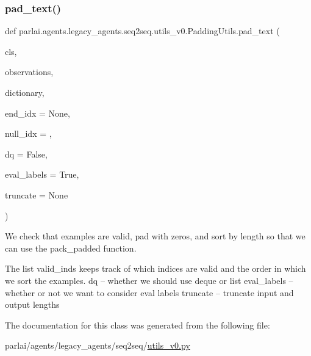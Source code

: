 \subsubsection{\texorpdfstring{pad\+\_\+text()}{pad\_text()}}
{\footnotesize\ttfamily def parlai.\+agents.\+legacy\+\_\+agents.\+seq2seq.\+utils\+\_\+v0.\+Padding\+Utils.\+pad\+\_\+text (\begin{DoxyParamCaption}\item[{}]{cls,  }\item[{}]{observations,  }\item[{}]{dictionary,  }\item[{}]{end\+\_\+idx = {\ttfamily None},  }\item[{}]{null\+\_\+idx = {},  }\item[{}]{dq = {\ttfamily False},  }\item[{}]{eval\+\_\+labels = {\ttfamily True},  }\item[{}]{truncate = {\ttfamily None} }\end{DoxyParamCaption})}

\begin{DoxyVerb}We check that examples are valid, pad with zeros, and sort by length so that we
can use the pack_padded function.

The list valid_inds
keeps track of which indices are valid and the order in which we sort
the examples.
dq -- whether we should use deque or list
eval_labels -- whether or not we want to consider eval labels
truncate -- truncate input and output lengths
\end{DoxyVerb}
 

The documentation for this class was generated from the following file\+:\begin{DoxyCompactItemize}
\item 
parlai/agents/legacy\+\_\+agents/seq2seq/\hyperlink{utils__v0_8py}{utils\+\_\+v0.\+py}\end{DoxyCompactItemize}

